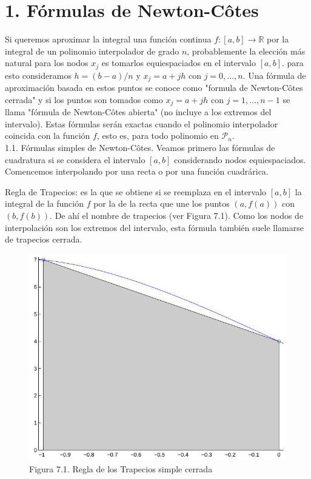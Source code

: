 \documentclass[10pt]{article}
\begin{document}
\section*{1. Fórmulas de Newton-Côtes}
Si queremos aproximar la integral una función continua $f:[a, b] \rightarrow \mathbb{R}$ por la integral de un polinomio interpolador de grado $n$, probablemente la elección más natural para los nodos $x_{j}$ es tomarlos equiespaciados en el intervalo $[a, b]$. para esto consideramos $h=(b-a) / n$ y $x_{j}=a+j h$ con $j=0, \ldots, n$. Una fórmula de aproximación basada en estos puntos se conoce como "formula de Newton-Côtes cerrada" y si los puntos son tomados como $x_{j}=a+j h$ con $j=1, \ldots, n-1$ se llama "fórmula de Newton-Côtes abierta" (no incluye a los extremos del intervalo). Estas fórmulas serán exactas cuando el polinomio interpolador coincida con la función $f$, esto es, para todo polinomio en $\mathcal{P}_{n}$.\\
1.1. Fórmulas simples de Newton-Côtes. Veamos primero las fórmulas de cuadratura si se considera el intervalo $[a, b]$ considerando nodos equiespaciados. Comencemos interpolando por una recta o por una función cuadrárica.

Regla de Trapecios: es la que se obtiene si se reemplaza en el intervalo $[a, b]$ la integral de la función $f$ por la de la recta que une los puntos $(a, f(a))$ con $(b, f(b))$. De ahí el nombre de trapecios (ver Figura 7.1). Como los nodos de interpolación son los extremos del intervalo, esta fórmula también suele llamarse de trapecios cerrada.

\begin{figure}[h]
\begin{center}
  \includegraphics[width=\textwidth]{2025_09_05_3888c9ac96bd653d96b4g-139}
\captionsetup{labelformat=empty}
\caption{Figura 7.1. Regla de los Trapecios simple cerrada}
\end{center}
\end{figure}
\end{document}
